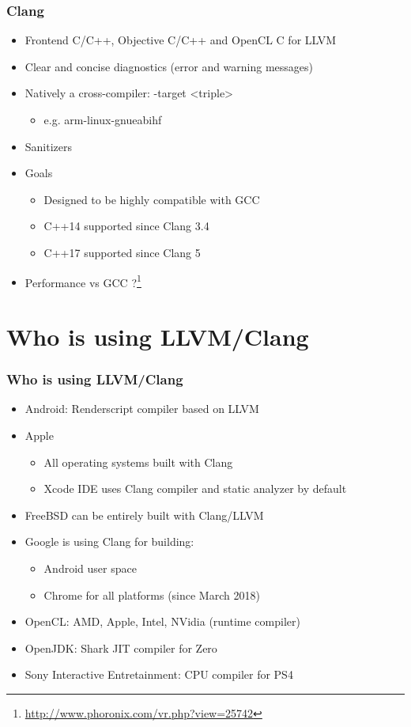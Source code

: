 \documentclass{smilebeamer}
\begin{document}
\begin{frame}
\frametitle{Clang}
\begin{itemize}
  \item Frontend C/C++, Objective C/C++ and OpenCL C for LLVM
  \item Clear and concise diagnostics (error and warning messages)
  \item Natively a cross-compiler: {\selectfont -target <triple>}
  \begin{itemize}
    \item e.g. arm-linux-gnueabihf
  \end{itemize}
  \item Sanitizers
  \item Goals
  \begin{itemize}
    \item Designed to be highly compatible with GCC
    \item C++14 supported since Clang 3.4
    \item C++17 supported since Clang 5
  \end{itemize}
  \item Performance vs GCC ?\footnote{\url{http://www.phoronix.com/vr.php?view=25742}}
\end{itemize}
\end{frame}
\section{Who is using LLVM/Clang}

\begin{frame}
\frametitle{Who is using LLVM/Clang}
\begin{itemize}
  \item Android: Renderscript compiler based on LLVM
  \item Apple
  \begin{itemize}
    \item All operating systems built with Clang
    \item Xcode IDE uses Clang compiler and static analyzer by default
  \end{itemize}
  \item FreeBSD can be entirely built with Clang/LLVM
  \item Google is using Clang for building:
  \begin{itemize}
    \item Android user space
    \item Chrome for all platforms (since March 2018)
  \end{itemize}
  \item OpenCL: AMD, Apple, Intel, NVidia (runtime compiler)
  \item OpenJDK: Shark JIT compiler for Zero
  \item Sony Interactive Entretainment: CPU compiler for PS4
\end{itemize}
\end{frame}
\iffalse
\end{document}

